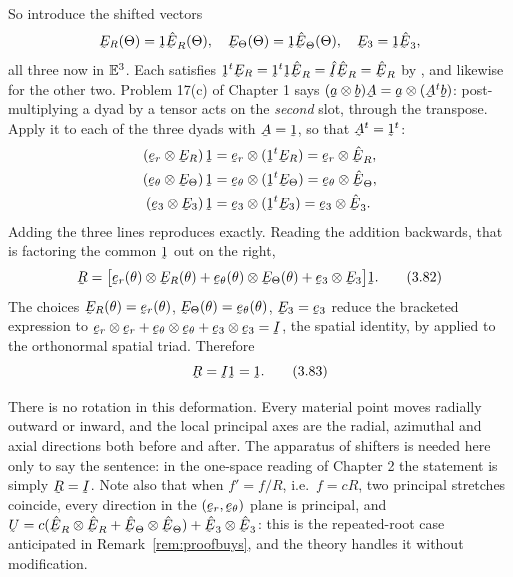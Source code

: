 So introduce the shifted vectors
\[
   \bE_{R}(\Theta)=\shift\hER(\Theta),\quad
   \bE_{\Theta}(\Theta)=\shift\hETh(\Theta),\quad
   \bE_{3}=\shift\hbE_{3},
\]
all three now in $\mathbb{E}^{3}$. Each satisfies $\shift^{t}\bE_{R}
=\shift^{t}\shift\hER=\hI\hER=\hER$ by , and likewise for the
other two. Problem 17(c) of Chapter 1 says
$(\ba\otimes\bb)\bA=\ba\otimes(\bA^{t}\bb)$: post-multiplying a dyad by a
tensor acts on the \emph{second} slot, through the transpose. Apply it to
each of the three dyads with $\bA=\shift$, so that $\bA^{t}=\shift^{t}$:
\[
\begin{aligned}
   (\ber\otimes\bE_{R})\,\shift
     &=\ber\otimes(\shift^{t}\bE_{R})=\ber\otimes\hER,\\
   (\bet\otimes\bE_{\Theta})\,\shift
     &=\bet\otimes(\shift^{t}\bE_{\Theta})=\bet\otimes\hETh,\\
   (\be_{3}\otimes\bE_{3})\,\shift
     &=\be_{3}\otimes(\shift^{t}\bE_{3})=\be_{3}\otimes\hbE_{3}.
\end{aligned}
\]
Adding the three lines reproduces  exactly. Reading the addition
backwards, that is factoring the common $\shift$ out on the right,
\begin{equation}
   \bR=\big[\ber(\theta)\otimes\bE_{R}(\theta)
           +\bet(\theta)\otimes\bE_{\Theta}(\theta)
           +\be_{3}\otimes\bE_{3}\big]\shift .
   \tag{3.82}\label{eq:3.82}
\end{equation}
The choices $\bE_{R}(\theta)=\ber(\theta)$,
$\bE_{\Theta}(\theta)=\bet(\theta)$, $\bE_{3}=\be_{3}$ reduce the
bracketed expression to $\ber\otimes\ber+\bet\otimes\bet
+\be_{3}\otimes\be_{3}=\I$, the spatial identity, by  applied to
the orthonormal spatial triad. Therefore
\begin{equation}
   \bR=\I\shift=\shift .
   \tag{3.83}\label{eq:3.83}
\end{equation}

\begin{remark}\label{rem:R1}
There is no rotation in this deformation. Every material point moves
radially outward or inward, and the local principal axes are the radial,
azimuthal and axial directions both before and after. The apparatus of
shifters is needed here only to say the sentence: in the one-space reading
of Chapter 2 the statement is simply $\bR=\I$. Note also that when
$f'=f/R$, i.e.\ $f=cR$, two principal stretches coincide, every direction
in the $(\ber,\bet)$ plane is principal, and $\bU=c(\hER\otimes\hER
+\hETh\otimes\hETh)+\hbE_{3}\otimes\hbE_{3}$: this is the repeated-root
case anticipated in Remark~\ref{rem:proofbuys}, and the theory handles it
without modification.
\end{remark}

